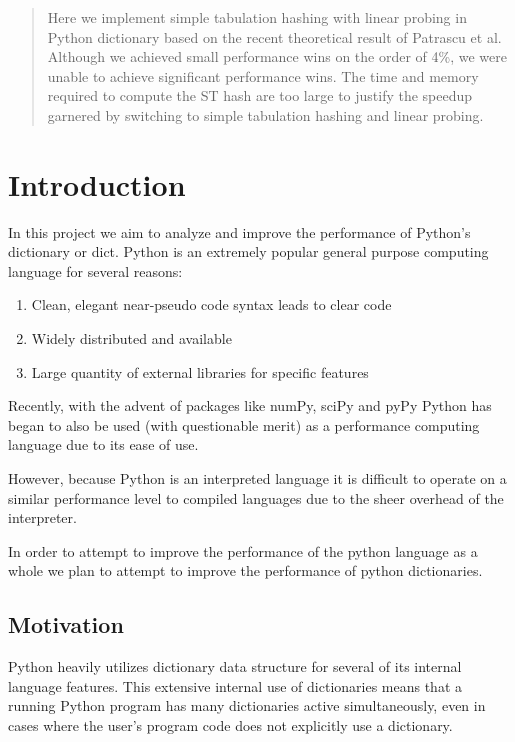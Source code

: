 \documentclass[11pt]{article}
\begin{document}
\maketitle
\doublespace

\begin{abstract}
Here we implement simple tabulation hashing with linear probing in Python dictionary based on the recent theoretical result of Patrascu et al. Although we achieved small performance wins on the order of 4\%, we were unable to achieve significant performance wins.  The time and memory required to compute the ST hash are too large to justify the speedup garnered by switching to simple tabulation hashing and linear probing.
\end{abstract}


\section{Introduction}
In this project we aim to analyze and improve the performance of Python's dictionary or dict.  Python is an extremely popular general purpose computing language for several reasons:
\begin{enumerate}
 \item Clean, elegant near-pseudo code syntax leads to clear code 
 \item Widely distributed and available
 \item Large quantity of external libraries for specific features 
\end{enumerate}

Recently, with the advent of packages like numPy, sciPy and pyPy Python has began to also be used (with questionable merit) as a performance computing language due to its ease of use.

However, because Python is an interpreted language it is difficult to operate on a similar performance level to compiled languages due to the sheer overhead of the interpreter.

In order to attempt to improve the performance of the python language as a whole we plan to attempt to improve the performance of python dictionaries.

\subsection{Motivation}
Python heavily utilizes dictionary data structure for several of its internal language features. This extensive internal use of dictionaries means that a running Python program has many dictionaries active simultaneously, even in cases where the user's program code does not explicitly use a dictionary. 
\end{document}
